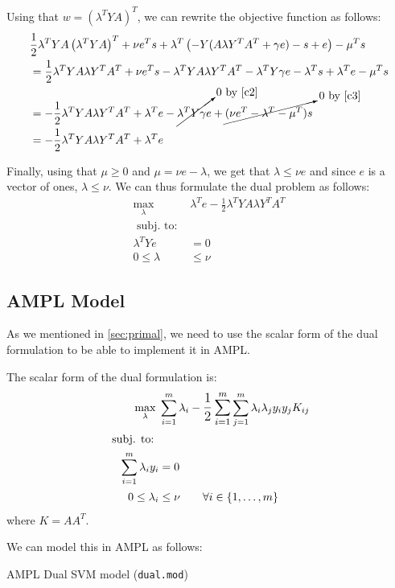 Using that $w = \left(\lambda^T YA\right)^T$, we can
rewrite the objective function as follows:
\begin{align*}
    & \frac{1}{2}
    \lambda^T YA \left(\lambda^T YA\right)^T
    + \nu e^T s
    + \lambda^T \left(-Y(A\lambda Y^T A^T + \gamma e) - s + e\right)
    - \mu^T s
    \\
    &= \frac{1}{2}
    \lambda^T YA \lambda Y^T A^T
    + \nu e^T s
    - \lambda^T Y A \lambda Y^T A^T
    - \lambda^T Y \gamma e
    -\lambda^T s
    +\lambda^T e
    - \mu^T s \\
    &= - \frac{1}{2}
    \lambda^T Y A \lambda Y^T A^T
    + \lambda^T e
    - \cancelto{0 \text{ by }\ref{c2}}{\lambda^T Y \gamma e \vphantom{\frac{1}{2}}}
    + \cancelto{0 \text{ by }\ref{c3}}{(\nu e^T
       - \lambda^T 
   - \mu^T) s}
    \\
    &= - \frac{1}{2}
    \lambda^T Y A \lambda Y^T A^T
    + \lambda^T e
\end{align*}

Finally, using that $\mu \geq 0$ and $\mu = \nu e - \lambda$,
we get that $\lambda \leq \nu e$ and since $e$ is a vector of ones,
$\lambda \leq \nu$. We can thus formulate the dual problem as follows:
\begin{align*}
    \max_{\lambda}\; & \lambda^T e - \frac{1}{2} \lambda^T Y A \lambda Y^T A^T
    \\
    \text{ subj. to: } \\
    \lambda^T Y e & = 0 \\
    0 \leq \lambda & \leq \nu
\end{align*}


\pagebreak
\subsection{AMPL Model}

As we mentioned in \cref{sec:primal}, we need to use
the scalar form of the dual formulation to be able to
implement it in AMPL.

The scalar form of the dual formulation is:
\begin{align*}
    \max_{\lambda}\; & \sum_{i=1}^m \lambda_i - 
    \mathlarger{\frac{1}{2}
    \sum_{i=1}^m}
    \sum_{j=1}^m \lambda_i \lambda_j y_i y_j K_{ij}
    \\
    \text{ subj. to: } \\
    \sum_{i=1}^m \lambda_i y_i & = 0 \\
    0 \leq \lambda_i & \leq \nu \qquad \forall i \in \{1,\ldots,m\}
\end{align*}
where $K = AA^T$.

We can model this in AMPL as follows:

\begin{listing}[H]
    \caption{AMPL Dual SVM model (\texttt{dual.mod})}
    \inputminted{ampl}{../ampl/dual.mod}
\end{listing}

